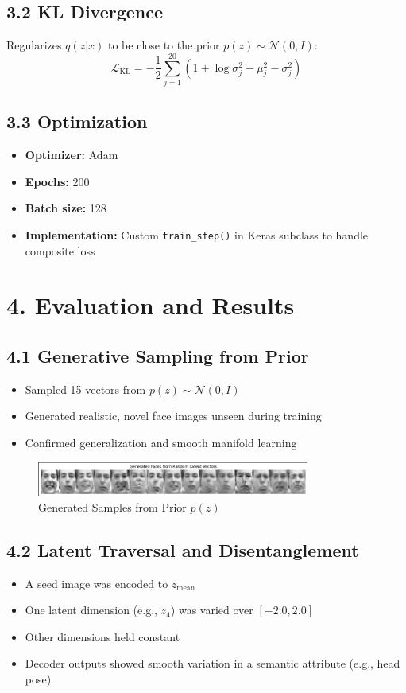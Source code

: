 \documentclass[12pt]{article}
\begin{document}
\subsection*{3.2 KL Divergence}
Regularizes $q(z|x)$ to be close to the prior $p(z) \sim \mathcal{N}(0, I)$:
\[
\mathcal{L}_{\text{KL}} = -\frac{1}{2} \sum_{j=1}^{20} \left(1 + \log \sigma_j^2 - \mu_j^2 - \sigma_j^2\right)
\]

\subsection*{3.3 Optimization}
\begin{itemize}
    \item \textbf{Optimizer:} Adam
    \item \textbf{Epochs:} 200
    \item \textbf{Batch size:} 128
    \item \textbf{Implementation:} Custom \texttt{train\_step()} in Keras subclass to handle composite loss
\end{itemize}

\section*{4. Evaluation and Results}

\subsection*{4.1 Generative Sampling from Prior}
\begin{itemize}
    \item Sampled 15 vectors from $p(z) \sim \mathcal{N}(0, I)$
    \item Generated realistic, novel face images unseen during training
    \item Confirmed generalization and smooth manifold learning
\end{itemize}

\begin{figure}
    \centering
\includegraphics[width=0.8\textwidth,height=0.8\textheight,keepaspectratio]{generated_face.png}
    \caption{Generated Samples from Prior $p(z)$ }
\end{figure}


\subsection*{4.2 Latent Traversal and Disentanglement}
\begin{itemize}
    \item A seed image was encoded to $z_{\text{mean}}$
    \item One latent dimension (e.g., $z_4$) was varied over $[-2.0, 2.0]$
    \item Other dimensions held constant
    \item Decoder outputs showed smooth variation in a semantic attribute (e.g., head pose)
\end{itemize}
\end{document}
